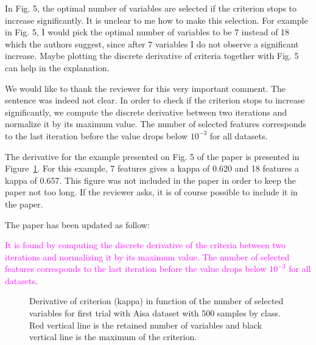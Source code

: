 \documentclass[a4paper,10pt,DIV=16]{scrartcl}
\newcommand{\rev}[1]{\textcolor{magenta}{#1}}
\begin{document}
\begin{revbox}
  In Fig. 5, the optimal number of variables are selected if the criterion stops to increase significantly. It is unclear to me how to make this selection. For example in Fig. 5, I would pick the optimal number of variables to be 7 instead of 18 which the authors suggest, since after 7 variables I do not observe a significant increase. Maybe plotting the discrete derivative of criteria together with Fig. 5 can help in the explanation.
  \begin{resbox}
    We would like to thank the reviewer for this very important comment. The sentence was indeed not clear.  In order to check if the criterion stops to increase significantly, we compute the discrete derivative between two iterations and normalize it by its maximum value. The number of selected features corresponds to the last iteration before the value drops below $10^{-3}$ for all datasets.

    The derivative for the example presented on Fig. 5 of the paper is presented in Figure~\ref{fig:deriv}.  For this example, 7 features gives a kappa of $0.620$ and 18 features a kappa of $0.657$. This figure was not included in the paper in order to keep the paper not too long. If the reviewer asks, it is of course possible to include it in the paper.

    The paper has been updated as follow:

    \rev{It  is found  by  computing the  discrete  derivative of  the
      criteria  between  two  iterations  and normalizing  it  by  its
      maximum value.   The number of selected  features corresponds to
      the last  iteration before the  value drops below  $10^{-3}$ for
      all datasets}.

  \end{resbox}
\end{revbox}

\begin{figure}[!ht]
  \centering
  \caption{Derivative of criterion (kappa) in function of the number of selected variables for first trial with Aisa dataset with 500 samples by class. Red vertical line is the retained number of variables and black vertical line is the maximum of the criterion.\label{fig:deriv}}
\end{figure}
\end{document}
